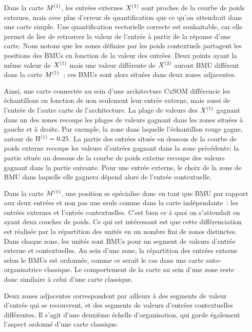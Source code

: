 \documentclass[../main]{subfiles}
\begin{document}
Dans la carte $M^{({1})}$, les entrées externes $X^{({1})}$ sont proches de la courbe de poids externes, mais avec plus d'erreur de quantification que ce qu'on attendrait dans une carte simple. Une quantification vectorielle correcte est souhaitable, car elle permet de lier de retrouver la valeur de l'entrée à partir de la réponse d'une carte.
Nous notons que les zones définies par les poids contextuels partagent les positions des BMUs en fonction de la valeur des entrées. 
Deux points ayant la même valeur de $X^{({1})}$ mais une valeur différente de $X^{({2})}$ auront BMU différent dans la carte $M^{({1})}$~; ces BMUs sont alors situées dans deux zones adjacentes.

Ainsi, une carte connectée au sein d'une architecture CxSOM différencie les échantillons en fonction de non seulement leur entrée externe, mais aussi de l'entrée de l'autre carte de l'architecture. La plage de valeurs des $X^{({1})}$ gagnant dans un des zones recoupe les plages de valeurs gagnant dans les zones situées à gauche et à droite. Par exemple, la zone dans laquelle l'échantillon rouge gagne, autour de $\Pi^{({1})} = 0.25$. La partie des entrées située en dessous de la courbe de poids externe recoupe les valeurs d'entrées gagnant dans la zone précédente; la partie située au dessous de la courbe de poids externe recoupe des valeurs gagnant dans la partie suivante. Pour une entrée externe, le choix de la zone de BMU dans laquelle elle gagnera dépend alors de l'entrée contextuelle. 


Dans la carte $M^{({1})}$, une position se spécialise donc en tant que BMU par rapport aux deux entrées et non pas une seule comme dans la carte indépendante~: les entrées externes et l'entrée contextuelles. C'est bien ce à quoi on s'attendait en ayant deux couches de poids. Ce qui est intéressant est que cette différenciation est réalisée par la répartition des unités en un nombre fini de zones distinctes. Dans chaque zone, les unités sont BMUs pour un segment de valeurs d'entrée externe et contextuelles. Au sein d'une zone, la répartition des entrées externe selon le BMUs est ordonnée, comme ce serait le cas dans une carte auto-organisatrice classique. Le comportement de la carte au sein d'une zone reste donc similaire à celui d'une carte classique.

Deux zones adjacentes correspondent par ailleurs à des segments de valeur d'entrée qui se recouvrent, et des segments de valeurs d'entrées contextuelles différentes. 
Il s'agit d'une deuxième échelle d'organisation, qui garde également l'aspect ordonné d'une carte classique. 
\end{document}
